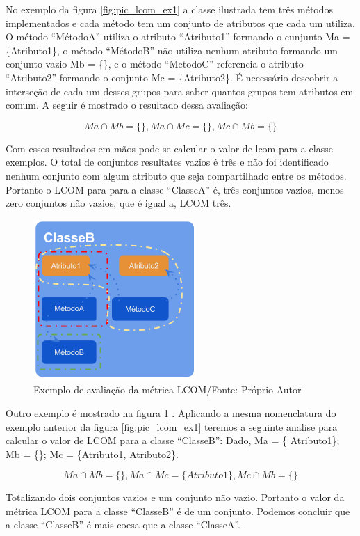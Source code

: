 \begin{description}
No exemplo da figura \ref{fig:pic_lcom_ex1} a classe ilustrada tem três métodos
implementados e cada método tem um conjunto de atributos que cada um utiliza.
O método ``MétodoA'' utiliza o atributo ``Atributo1'' formando o cunjunto Ma =
\{Atributo1\}, o método ``MétodoB'' não utiliza nenhum atributo formando um
conjunto vazio Mb = \{\}, e o método ``MetodoC'' referencia o atributo
``Atributo2'' formando o conjunto Mc = \{Atributo2\}. É necessário descobrir a
interseção de cada um desses grupos para saber quantos grupos tem atributos em
comum. A seguir é mostrado o resultado dessa avaliação:

\[
Ma \cap Mb = \{ \},
Ma \cap Mc = \{ \},
Mc \cap Mb = \{ \}
\]

Com esses resultados em mãos pode-se calcular o valor de lcom para a classe
exemplos. O total de conjuntos resultates vazios é três  e não foi identificado
nenhum conjunto com algum atributo que seja compartilhado entre os métodos.
Portanto o LCOM para para a classe ``ClasseA'' é, três conjuntos vazios, menos
zero conjuntos não vazios, que é igual a, LCOM três.

\begin{figure}[!h]
	\centering
	\includegraphics[scale=0.8]{img/pic_lcom_ex2.png}
	\caption{Exemplo  de avaliação da métrica LCOM/Fonte: Próprio Autor}
	\label{fig:pic_lcom_ex2}
\end{figure}

Outro exemplo é mostrado na figura \ref{fig:pic_lcom_ex2} . Aplicando a mesma
nomenclatura do exemplo anterior da figura \ref{fig:pic_lcom_ex1} teremos a
seguinte analise para calcular o valor de LCOM para a classe ``ClasseB'': Dado,
Ma = \{ Atributo1\}; Mb = \{\}; Mc = \{Atributo1, Atributo2\}. 

\[
Ma \cap Mb = \{ \},
Ma \cap Mc = \{ Atributo1 \},
Mc \cap Mb = \{ \}
\]

Totalizando dois conjuntos vazios e um conjunto não vazio. Portanto o valor da
métrica LCOM para a classe ``ClasseB'' é de um conjunto. Podemos concluir que a
classe ``ClasseB'' é mais coesa que  a classe ``ClasseA''.



\end{description}
